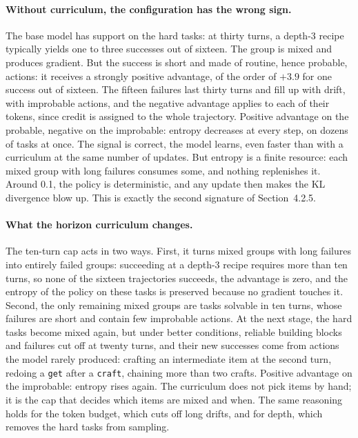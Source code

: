 \documentclass[11pt,a4paper]{article}
\begin{document}
\paragraph{Without curriculum, the configuration has the wrong sign.} The base model has support on the hard tasks: at thirty turns, a depth-3 recipe typically yields one to three successes out of sixteen. The group is mixed and produces gradient. But the success is short and made of routine, hence probable, actions: it receives a strongly positive advantage, of the order of $+3.9$ for one success out of sixteen. The fifteen failures last thirty turns and fill up with drift, with improbable actions, and the negative advantage applies to each of their tokens, since credit is assigned to the whole trajectory. Positive advantage on the probable, negative on the improbable: entropy decreases at every step, on dozens of tasks at once. The signal is correct, the model learns, even faster than with a curriculum at the same number of updates. But entropy is a finite resource: each mixed group with long failures consumes some, and nothing replenishes it. Around 0.1, the policy is deterministic, and any update then makes the KL divergence blow up. This is exactly the second signature of Section~4.2.5.

\paragraph{What the horizon curriculum changes.} The ten-turn cap acts in two ways. First, it turns mixed groups with long failures into entirely failed groups: succeeding at a depth-3 recipe requires more than ten turns, so none of the sixteen trajectories succeeds, the advantage is zero, and the entropy of the policy on these tasks is preserved because no gradient touches it. Second, the only remaining mixed groups are tasks solvable in ten turns, whose failures are short and contain few improbable actions. At the next stage, the hard tasks become mixed again, but under better conditions, reliable building blocks and failures cut off at twenty turns, and their new successes come from actions the model rarely produced: crafting an intermediate item at the second turn, redoing a \texttt{get} after a \texttt{craft}, chaining more than two crafts. Positive advantage on the improbable: entropy rises again. The curriculum does not pick items by hand; it is the cap that decides which items are mixed and when. The same reasoning holds for the token budget, which cuts off long drifts, and for depth, which removes the hard tasks from sampling.
\end{document}
